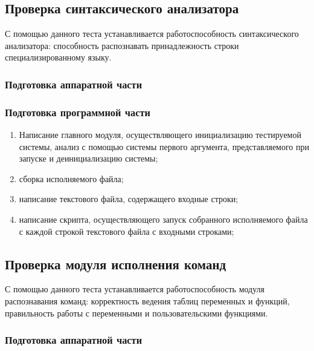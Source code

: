 \documentclass[a4paper, 12pt]{article}
\begin{document}

\subsection{Проверка синтаксического анализатора} %

С помощью данного теста устанавливается работоспособность синтаксического анализатора:
способность распознавать принадлежность строки специализированному языку.
\subsubsection{Подготовка аппаратной части} %
\subsubsection{Подготовка программной части} %
\begin{enumerate}
	\item Написание главного модуля, осуществляющего инициализацию
		тестируемой системы, анализ с помощью системы первого аргумента,
		представляемого при запуске и деинициализацию системы;
	\item сборка исполняемого файла;
	\item написание текстового файла, содержащего входные строки;
	\item написание скрипта, осуществляющего запуск собранного исполняемого файла
		с каждой строкой текстового файла с входными строками;
\end{enumerate}


\subsection{Проверка модуля исполнения команд} %

С помощью данного теста устанавливается работоспособность модуля распознавания команд:
корректность ведения таблиц переменных и функций, правильность работы с переменными и пользовательскими функциями.
\subsubsection{Подготовка аппаратной части} %
\end{document}
